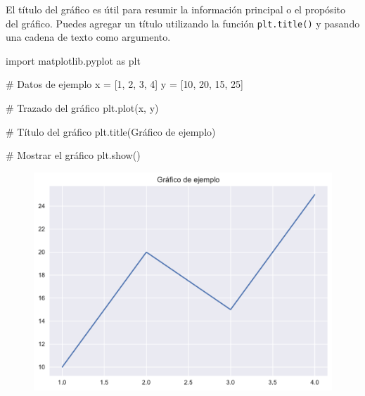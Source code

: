 \documentclass[
  a4paper,
]{article}
\newenvironment{Shaded}{}{}
\newcommand{\CommentTok}[1]{\textcolor[rgb]{0.42,0.45,0.49}{#1}}
\newcommand{\DecValTok}[1]{\textcolor[rgb]{0.00,0.36,0.77}{#1}}
\newcommand{\ImportTok}[1]{\textcolor[rgb]{0.01,0.18,0.38}{#1}}
\newcommand{\NormalTok}[1]{\textcolor[rgb]{0.14,0.16,0.18}{#1}}
\newcommand{\OperatorTok}[1]{\textcolor[rgb]{0.14,0.16,0.18}{#1}}
\newcommand{\StringTok}[1]{\textcolor[rgb]{0.01,0.18,0.38}{#1}}
\begin{document}
El título del gráfico es útil para resumir la información principal o el
propósito del gráfico. Puedes agregar un título utilizando la función
\texttt{plt.title()} y pasando una cadena de texto como argumento.

\begin{Shaded}
\begin{Highlighting}[]
\ImportTok{import}\NormalTok{ matplotlib.pyplot }\ImportTok{as}\NormalTok{ plt}

\CommentTok{\# Datos de ejemplo}
\NormalTok{x }\OperatorTok{=}\NormalTok{ [}\DecValTok{1}\NormalTok{, }\DecValTok{2}\NormalTok{, }\DecValTok{3}\NormalTok{, }\DecValTok{4}\NormalTok{]}
\NormalTok{y }\OperatorTok{=}\NormalTok{ [}\DecValTok{10}\NormalTok{, }\DecValTok{20}\NormalTok{, }\DecValTok{15}\NormalTok{, }\DecValTok{25}\NormalTok{]}

\CommentTok{\# Trazado del gráfico}
\NormalTok{plt.plot(x, y)}

\CommentTok{\# Título del gráfico}
\NormalTok{plt.title(}\StringTok{\textquotesingle{}Gráfico de ejemplo\textquotesingle{}}\NormalTok{)}

\CommentTok{\# Mostrar el gráfico}
\NormalTok{plt.show()}
\end{Highlighting}
\end{Shaded}

\begin{figure}[H]

{\centering \includegraphics{index_files/figure-pdf/cell-10-output-1.pdf}

}

\end{figure}
\end{document}
